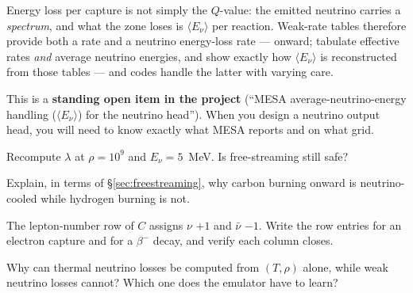 Energy loss per capture is not simply the $Q$-value: the emitted neutrino
carries a \emph{spectrum}, and what the zone loses is $\langle E_\nu\rangle$
per reaction. Weak-rate tables therefore provide both a rate and a neutrino
energy-loss rate --- \citeauthor{ffn}{} onward; \citet{langanke2001} tabulate effective rates
\emph{and} average neutrino energies, and \citet{patton2017} show exactly how
$\langle E_\nu\rangle$ is reconstructed from those tables --- and codes handle
the latter with varying care.

This is a \textbf{standing open item in the project} (``MESA
average-neutrino-energy handling ($\langle E_\nu\rangle$) for the neutrino
head''). When you design a neutrino output head, you will need to know exactly
what MESA reports and on what grid.

\begin{selfcheck}
\item Recompute $\lambda$ at $\rho = 10^{9}$ and $E_\nu = 5$~MeV. Is
      free-streaming still safe?
\item Explain, in terms of \S\ref{sec:freestreaming}, why carbon burning onward
      is neutrino-cooled while hydrogen burning is not.
\item The lepton-number row of $C$ assigns $\nu$ $+1$ and $\bar\nu$ $-1$. Write
      the row entries for an electron capture and for a $\beta^-$ decay, and
      verify each column closes.
\item Why can thermal neutrino losses be computed from $(T,\rho)$ alone, while
      weak neutrino losses cannot? Which one does the emulator have to learn?
\end{selfcheck}
